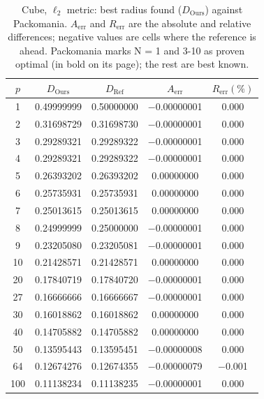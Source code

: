 \begin{table}[h!]
  \centering
  \caption{Cube, $\ell_2$ metric: best radius found ($D_{\mathrm{Ours}}$) against Packomania. $A_{\text{err}}$ and $R_{\text{err}}$ are the absolute and relative differences; negative values are cells where the reference is ahead. Packomania marks N = 1 and 3-10 as proven optimal (in bold on its page); the rest are best known.}
  \label{tab:cube_euclidean}
  \begin{tabular}{ccccc}
    \hline
    $p$ & $D_{\mathrm{Ours}}$ & $D_{\mathrm{Ref}}$ & $A_{\text{err}}$ & $R_{\text{err}}(\%)$ \\
    \hline
    1 & 0.49999999 & 0.50000000 & $-$0.00000001 & 0.000 \\
    2 & 0.31698729 & 0.31698730 & $-$0.00000001 & 0.000 \\
    3 & 0.29289321 & 0.29289322 & $-$0.00000001 & 0.000 \\
    4 & 0.29289321 & 0.29289322 & $-$0.00000001 & 0.000 \\
    5 & 0.26393202 & 0.26393202 & 0.00000000 & 0.000 \\
    6 & 0.25735931 & 0.25735931 & 0.00000000 & 0.000 \\
    7 & 0.25013615 & 0.25013615 & 0.00000000 & 0.000 \\
    8 & 0.24999999 & 0.25000000 & $-$0.00000001 & 0.000 \\
    9 & 0.23205080 & 0.23205081 & $-$0.00000001 & 0.000 \\
    10 & 0.21428571 & 0.21428571 & 0.00000000 & 0.000 \\
    20 & 0.17840719 & 0.17840720 & $-$0.00000001 & 0.000 \\
    27 & 0.16666666 & 0.16666667 & $-$0.00000001 & 0.000 \\
    30 & 0.16018862 & 0.16018862 & 0.00000000 & 0.000 \\
    40 & 0.14705882 & 0.14705882 & 0.00000000 & 0.000 \\
    50 & 0.13595443 & 0.13595451 & $-$0.00000008 & 0.000 \\
    64 & 0.12674276 & 0.12674355 & $-$0.00000079 & $-$0.001 \\
    100 & 0.11138234 & 0.11138235 & $-$0.00000001 & 0.000 \\
    \hline
  \end{tabular}
\end{table}
